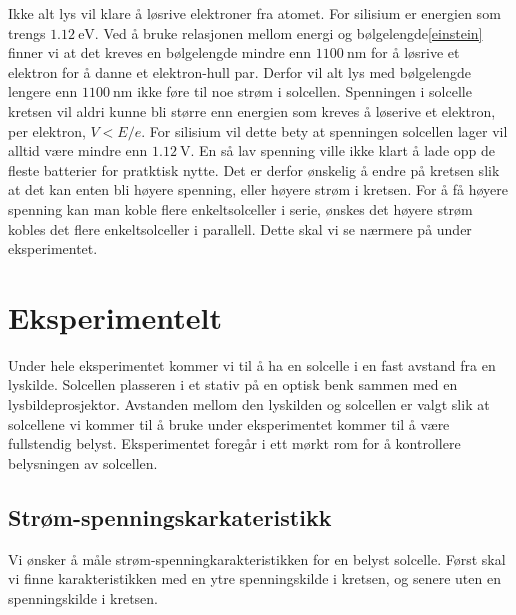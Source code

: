 \documentclass[%
 reprint,
 amsmath,amssymb,
 aps,
 norsk,
 booktabs
]{revtex4-1}
\begin{document}
Ikke alt lys vil klare å løsrive elektroner fra atomet. For silisium er energien som trengs $\SI{1.12}{\electronvolt}$. Ved å bruke relasjonen mellom energi og bølgelengde\eqref{einstein} finner vi at det kreves en bølgelengde mindre enn $\SI{1100}{\nano\meter}$ for å løsrive et elektron for å danne et elektron-hull par. Derfor vil alt lys med bølgelengde lengere enn $\SI{1100}{\nano\meter}$ ikke føre til noe strøm i solcellen. Spenningen i solcelle kretsen vil aldri kunne bli større enn energien som kreves å løserive et elektron, per elektron, $V<E/e$. For silisium vil dette bety at spenningen solcellen lager vil alltid være mindre enn $\SI{1.12}{\volt}$. En så lav spenning ville ikke klart å lade opp de fleste batterier for pratktisk nytte. Det er derfor ønskelig å endre på kretsen slik at det kan enten bli høyere spenning, eller høyere strøm i kretsen. For å få høyere spenning kan man koble flere enkeltsolceller i serie, ønskes det høyere strøm kobles det flere enkeltsolceller i parallell. Dette skal vi se nærmere på under eksperimentet.
\section{Eksperimentelt}
Under hele eksperimentet kommer vi til å ha en solcelle i en fast avstand fra en lyskilde. Solcellen plasseren i et stativ på en optisk benk sammen med en lysbildeprosjektor. Avstanden mellom den lyskilden og solcellen er valgt slik at solcellene vi kommer til å bruke under eksperimentet kommer til å være fullstendig belyst. Eksperimentet foregår i ett mørkt rom for å kontrollere belysningen av solcellen.\\
\subsection{Strøm-spenningskarkateristikk}
Vi ønsker å måle strøm-spenningkarakteristikken for en belyst solcelle. Først skal vi finne karakteristikken med en ytre spenningskilde i kretsen, og senere uten en spenningskilde i kretsen.
\end{document}
